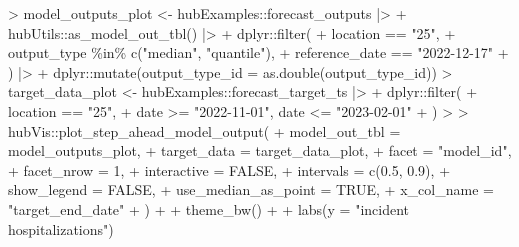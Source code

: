\documentclass[
]{article}
\newenvironment{Shaded}{\begin{snugshade}}{\end{snugshade}}
\newcommand{\AttributeTok}[1]{\textcolor[rgb]{0.40,0.45,0.13}{#1}}
\newcommand{\ConstantTok}[1]{\textcolor[rgb]{0.56,0.35,0.01}{#1}}
\newcommand{\DecValTok}[1]{\textcolor[rgb]{0.68,0.00,0.00}{#1}}
\newcommand{\ErrorTok}[1]{\textcolor[rgb]{0.68,0.00,0.00}{#1}}
\newcommand{\FloatTok}[1]{\textcolor[rgb]{0.68,0.00,0.00}{#1}}
\newcommand{\FunctionTok}[1]{\textcolor[rgb]{0.28,0.35,0.67}{#1}}
\newcommand{\NormalTok}[1]{\textcolor[rgb]{0.00,0.23,0.31}{#1}}
\newcommand{\OtherTok}[1]{\textcolor[rgb]{0.00,0.23,0.31}{#1}}
\newcommand{\SpecialCharTok}[1]{\textcolor[rgb]{0.37,0.37,0.37}{#1}}
\newcommand{\StringTok}[1]{\textcolor[rgb]{0.13,0.47,0.30}{#1}}
\begin{document}
\begin{Shaded}
\begin{Highlighting}[]
\SpecialCharTok{\textgreater{}}\NormalTok{ model\_outputs\_plot }\OtherTok{\textless{}{-}}\NormalTok{ hubExamples}\SpecialCharTok{::}\NormalTok{forecast\_outputs }\SpecialCharTok{|\textgreater{}}
\SpecialCharTok{+}\NormalTok{   hubUtils}\SpecialCharTok{::}\FunctionTok{as\_model\_out\_tbl}\NormalTok{() }\SpecialCharTok{|\textgreater{}}
\SpecialCharTok{+}\NormalTok{   dplyr}\SpecialCharTok{::}\FunctionTok{filter}\NormalTok{(}
\SpecialCharTok{+}\NormalTok{     location }\SpecialCharTok{==} \StringTok{"25"}\NormalTok{,}
\SpecialCharTok{+}\NormalTok{     output\_type }\SpecialCharTok{\%in\%} \FunctionTok{c}\NormalTok{(}\StringTok{"median"}\NormalTok{, }\StringTok{"quantile"}\NormalTok{),}
\SpecialCharTok{+}\NormalTok{     reference\_date }\SpecialCharTok{==} \StringTok{"2022{-}12{-}17"}
\SpecialCharTok{+}\NormalTok{   ) }\SpecialCharTok{|\textgreater{}}
\SpecialCharTok{+}\NormalTok{   dplyr}\SpecialCharTok{::}\FunctionTok{mutate}\NormalTok{(}\AttributeTok{output\_type\_id =} \FunctionTok{as.double}\NormalTok{(output\_type\_id))}
\SpecialCharTok{\textgreater{}}\NormalTok{ target\_data\_plot }\OtherTok{\textless{}{-}}\NormalTok{ hubExamples}\SpecialCharTok{::}\NormalTok{forecast\_target\_ts }\SpecialCharTok{|\textgreater{}}
\SpecialCharTok{+}\NormalTok{   dplyr}\SpecialCharTok{::}\FunctionTok{filter}\NormalTok{(}
\SpecialCharTok{+}\NormalTok{     location }\SpecialCharTok{==} \StringTok{"25"}\NormalTok{,}
\SpecialCharTok{+}\NormalTok{     date }\SpecialCharTok{\textgreater{}=} \StringTok{"2022{-}11{-}01"}\NormalTok{, date }\SpecialCharTok{\textless{}=} \StringTok{"2023{-}02{-}01"}
\SpecialCharTok{+}\NormalTok{   )}
\SpecialCharTok{\textgreater{}} 
\ErrorTok{\textgreater{}}\NormalTok{ hubVis}\SpecialCharTok{::}\FunctionTok{plot\_step\_ahead\_model\_output}\NormalTok{(}
\SpecialCharTok{+}   \AttributeTok{model\_out\_tbl =}\NormalTok{ model\_outputs\_plot,}
\SpecialCharTok{+}   \AttributeTok{target\_data =}\NormalTok{ target\_data\_plot,}
\SpecialCharTok{+}   \AttributeTok{facet =} \StringTok{"model\_id"}\NormalTok{,}
\SpecialCharTok{+}   \AttributeTok{facet\_nrow =} \DecValTok{1}\NormalTok{,}
\SpecialCharTok{+}   \AttributeTok{interactive =} \ConstantTok{FALSE}\NormalTok{,}
\SpecialCharTok{+}   \AttributeTok{intervals =} \FunctionTok{c}\NormalTok{(}\FloatTok{0.5}\NormalTok{, }\FloatTok{0.9}\NormalTok{),}
\SpecialCharTok{+}   \AttributeTok{show\_legend =} \ConstantTok{FALSE}\NormalTok{,}
\SpecialCharTok{+}   \AttributeTok{use\_median\_as\_point =} \ConstantTok{TRUE}\NormalTok{,}
\SpecialCharTok{+}   \AttributeTok{x\_col\_name =} \StringTok{"target\_end\_date"}
\SpecialCharTok{+}\NormalTok{ ) }\SpecialCharTok{+}
\SpecialCharTok{+}   \FunctionTok{theme\_bw}\NormalTok{() }\SpecialCharTok{+}
\SpecialCharTok{+}   \FunctionTok{labs}\NormalTok{(}\AttributeTok{y =} \StringTok{"incident hospitalizations"}\NormalTok{)}
\end{Highlighting}
\end{Shaded}
\end{document}
